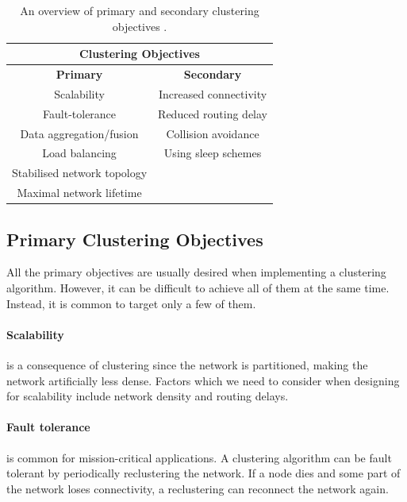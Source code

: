 \begin{table}[bt]
\centering
\caption{An overview of primary and secondary clustering objectives \cite{Afsar2014-clustering-survey}.}
\label{table:clustering-objective}
\begin{tabular}{cc}
\multicolumn{2}{c}{{\textbf{Clustering Objectives}}}                   \\ \hline
\multicolumn{1}{c|}{\textbf{Primary}}            & \textbf{Secondary}      \\ \hline
\multicolumn{1}{c|}{Scalability}                 & Increased connectivity  \\
\multicolumn{1}{c|}{Fault-tolerance}             & Reduced routing delay   \\
\multicolumn{1}{c|}{Data aggregation/fusion}     & Collision avoidance     \\
\multicolumn{1}{c|}{Load balancing}              & Using sleep schemes \\
\multicolumn{1}{c|}{Stabilised network topology} &                         \\
\multicolumn{1}{c|}{Maximal network lifetime}    &                        
\end{tabular}
\end{table}

\subsection{Primary Clustering Objectives}
All the primary objectives are usually desired when implementing a clustering algorithm. However, it can be difficult to achieve all of them at the same time. Instead, it is common to target only a few of them.

\paragraph*{Scalability} is a consequence of clustering since the network is partitioned, making the network artificially less dense. Factors which we need to consider when designing for scalability include network density and routing delays.

\paragraph*{Fault tolerance} is common for mission-critical applications. A clustering algorithm can be fault tolerant by periodically reclustering the network. If a node dies and some part of the network loses connectivity, a reclustering can reconnect the network again.

